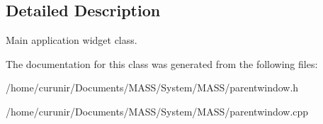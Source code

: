 \subsection{Detailed Description}
Main application widget class. 

The documentation for this class was generated from the following files\+:\begin{DoxyCompactItemize}
\item 
/home/curunir/\+Documents/\+M\+A\+S\+S/\+System/\+M\+A\+S\+S/parentwindow.\+h\item 
/home/curunir/\+Documents/\+M\+A\+S\+S/\+System/\+M\+A\+S\+S/parentwindow.\+cpp\end{DoxyCompactItemize}
